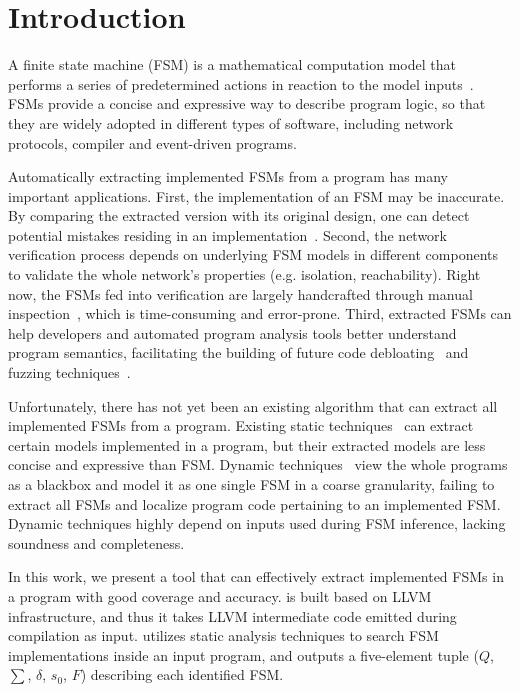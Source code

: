 \section{Introduction}
\label{sec:intro}

A finite state machine (FSM) is a mathematical computation model 
that performs a series of predetermined actions in 
reaction to the model inputs~\cite{fsm}. 
FSMs provide a concise and expressive way to describe
program logic, so that they are widely adopted in different types of software, 
including network protocols, 
compiler and event-driven programs. 

Automatically extracting implemented FSMs from a program has 
many important applications. 
First, the implementation of an FSM may be inaccurate. By 
comparing the extracted version with its original design, one 
can detect potential mistakes residing in an implementation~\cite{protocol-bug}. 
Second, the network verification process depends on underlying FSM models 
in different components to validate the whole network's properties 
(e.g. isolation, reachability).
Right now, the FSMs fed into verification are largely handcrafted through 
manual inspection~\cite{fayaz2016buzz,SymNet}, 
which is time-consuming and error-prone. 
Third, extracted FSMs can help developers and automated program analysis tools
better understand program semantics, facilitating the building of future 
code debloating~\cite{container-debloating-1,container-debloating-2,dinghao-1} 
and fuzzing techniques~\cite{afl,Angora,youwei-1}.



Unfortunately, there has not yet been an existing algorithm that can extract 
all implemented FSMs from a program.
Existing static techniques~\cite{wu2016automatic,khalid2016paving} 
can extract certain models implemented in a program,
but their extracted models are less concise and expressive than FSM. 
Dynamic techniques~\cite{angluin1987learning,moon2019alembic,cho2011mace} 
view the whole programs as a blackbox and 
model it as one single FSM in a coarse granularity, 
failing to extract all FSMs and localize program code 
pertaining to an implemented FSM. 
Dynamic techniques highly depend on inputs used during FSM inference, 
lacking soundness and completeness.  


In this work, we present a tool \Tool{} that can effectively extract implemented FSMs 
in a program
with good coverage and accuracy. 
\Tool{} is built based on LLVM infrastructure, 
and thus it takes LLVM intermediate 
code emitted during compilation as input. 
\Tool{} utilizes static analysis techniques to search FSM implementations inside 
an input program,
and outputs a five-element tuple ($Q$, $\sum$, $\delta$, $s_0$, $F$) 
describing each identified FSM. 



